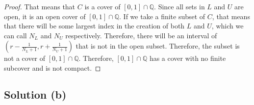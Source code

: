 \documentclass[11pt]{article}
\begin{document}
\begin{proof}
            That means that $C$ is a cover of $[0,1] \cap \mathbb{Q}$.
            Since all sets in $L$ and $U$ are open, it is an open cover of $[0,1] \cap \mathbb{Q}$.
            If we take a finite subset of $C$, that means that there will be some largest index in the creation of both $L$ and $U$, which we can call $N_L$ and $N_U$ respectively.
            Therefore, there will be an interval of $\left( r - \frac{1}{N_L + 1}, r + \frac{1}{N_U + 1} \right)$ that is not in the open subset.
            Therefore, the subset is not a cover of $[0,1] \cap \mathbb{Q}$.
            Therefore, $[0,1] \cap \mathbb{Q}$ has a cover with no finite subcover and is not compact.
        \end{proof}

    \subsection{Solution (b)}
\end{document}
